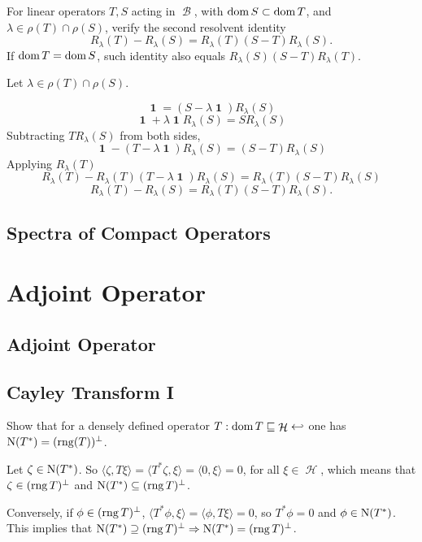 \documentclass{article}
\theoremstyle{exercisestyle}
\newenvironment{exercise}[1]
  {\renewcommand\theinnerex{#1}\innerex}
  {\endinnerex}
\DeclareMathOperator{\banach}{\mathcal{B}}
\DeclareMathOperator{\hilbert}{\mathcal{H}}
\DeclareMathOperator{\Id}{\textbf{1}}
\newcommand{\inner}[2]{\langle #1, #2 \rangle}
\begin{document}
\begin{exercise}{1.5.10}
    For linear operators $T, S$ acting in $\banach$, with $\operatorname{dom} S \subset \operatorname{dom} T$, and
    $\lambda \in \rho(T) \cap \rho(S)$, verify the second resolvent identity
    $$R_\lambda (T) - R_\lambda (S) = R_\lambda (T)(S - T)R_\lambda(S).$$
    If $\operatorname{dom} T = \operatorname{dom} S$, such identity also equals $R_\lambda (S)(S - T)R_\lambda (T)$.

    Let $\lambda \in \rho(T)\cap\rho(S)$.

    $$ \Id = (S - \lambda \Id) R_\lambda(S) $$
    $$ \Id + \lambda \Id  R_\lambda(S)  = S R_\lambda(S) $$
    Subtracting $T R_\lambda(S)$ from both sides,
    $$ \Id - (T-\lambda \Id)R_\lambda(S) = (S-T)R_\lambda(S) $$
    Applying $R_\lambda(T)$
    $$ R_\lambda(T) - R_\lambda(T) (T-\lambda \Id)R_\lambda(S) =  R_\lambda(T)(S-T)R_\lambda(S)  $$
    $$ R_\lambda(T) - R_\lambda(S) =  R_\lambda(T)(S-T)R_\lambda(S).$$

\end{exercise}

\subsection{Spectra of Compact Operators}

\section{Adjoint Operator}

\subsection{Adjoint Operator}

\subsection{Cayley Transform I}

\begin{exercise}{2.2.2}
    Show that for a densely defined operator $T : \dom T \sqsubseteq \hilbert \hookleftarrow$ one has $\operatorname{N}(T^*) = (\operatorname{rng} (T))^\perp$.

    Let $\zeta \in \operatorname{N} (T^*)$. So $\inner{\zeta}{T \xi} = \inner{T^* \zeta}{\xi} = \inner{0}{\xi} = 0$, for all $\xi \in \hilbert$, 
    which means that $\zeta \in (\operatorname{rng} T)^\perp$ and $\operatorname{N} (T^*) \subseteq (\operatorname{rng} T)^\perp$. 
    
    Conversely, if $\phi \in (\operatorname{rng} T)^\perp$,
    $ \inner{T^* \phi}{\xi} = \inner{\phi}{T\xi} = 0$, so $T^*\phi = 0$ and $\phi \in \operatorname{N} (T^*)$. 
    This implies that $\operatorname{N} (T^*) \supseteq (\operatorname{rng} T)^\perp \Rightarrow \operatorname{N} (T^*) = (\operatorname{rng} T)^\perp$.

    
\end{exercise}
\end{document}
